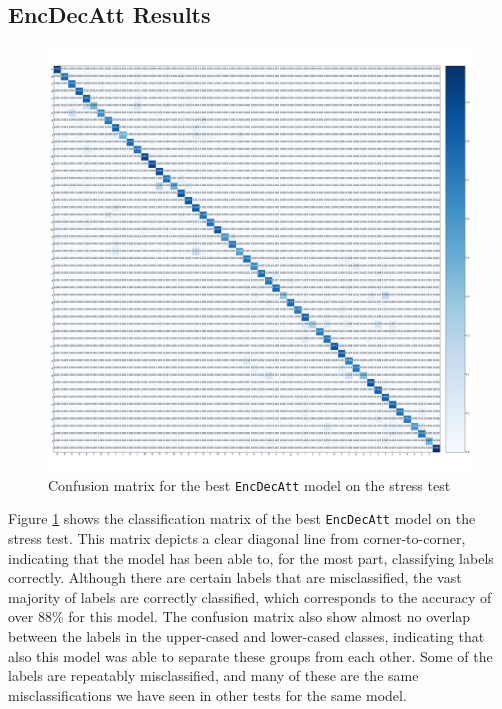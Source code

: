 \subsection{EncDecAtt Results}
\begin{figure}[H]
    \centering
    \includegraphics[width=1\textwidth]{fig/results/experiment4/encdecatt/confusion_matrix.png}
    \caption{Confusion matrix for the best {\tt EncDecAtt} model on the stress test}
    \label{fig:result4_encdecatt_confusion_matrix}
\end{figure}

Figure \ref{fig:result4_encdecatt_confusion_matrix} shows the classification matrix of the best {\tt EncDecAtt} model on the stress test. This matrix depicts a clear diagonal line from corner-to-corner, indicating that the model has been able to, for the most part, classifying labels correctly. Although there are certain labels that are misclassified, the vast majority of labels are correctly classified, which corresponds to the accuracy of over 88\% for this model. The confusion matrix also show almost no overlap between the labels in the upper-cased and lower-cased classes, indicating that also this model was able to separate these groups from each other. Some of the labels are repeatably misclassified, and many of these are the same misclassifications we have seen in other tests for the same model.

